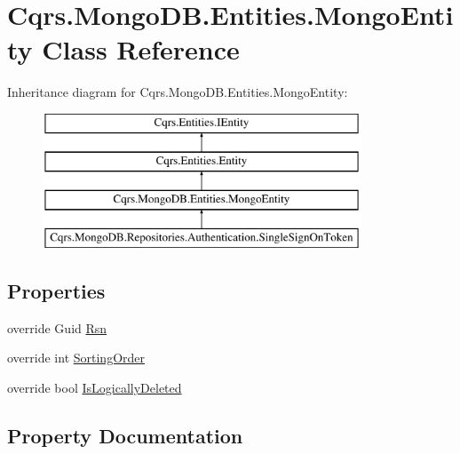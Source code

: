 \hypertarget{classCqrs_1_1MongoDB_1_1Entities_1_1MongoEntity}{}\section{Cqrs.\+Mongo\+D\+B.\+Entities.\+Mongo\+Entity Class Reference}
\label{classCqrs_1_1MongoDB_1_1Entities_1_1MongoEntity}
Inheritance diagram for Cqrs.\+Mongo\+D\+B.\+Entities.\+Mongo\+Entity\+:\begin{figure}[H]
\begin{center}
\leavevmode
\includegraphics[height=4.000000cm]{classCqrs_1_1MongoDB_1_1Entities_1_1MongoEntity}
\end{center}
\end{figure}
\subsection*{Properties}
\begin{DoxyCompactItemize}
\item 
override Guid \hyperlink{classCqrs_1_1MongoDB_1_1Entities_1_1MongoEntity_acc0c0c4d927e9abfe88415cababff6b5}{Rsn}
\item 
override int \hyperlink{classCqrs_1_1MongoDB_1_1Entities_1_1MongoEntity_a3d5f7476fc2de3b9061ea3e76e77e0cb}{Sorting\+Order}
\item 
override bool \hyperlink{classCqrs_1_1MongoDB_1_1Entities_1_1MongoEntity_a763ab3fddd6f7d07e907c274bea305f5}{Is\+Logically\+Deleted}
\end{DoxyCompactItemize}


\subsection{Property Documentation}
\mbox{\label{classCqrs_1_1MongoDB_1_1Entities_1_1MongoEntity_a763ab3fddd6f7d07e907c274bea305f5}} 

